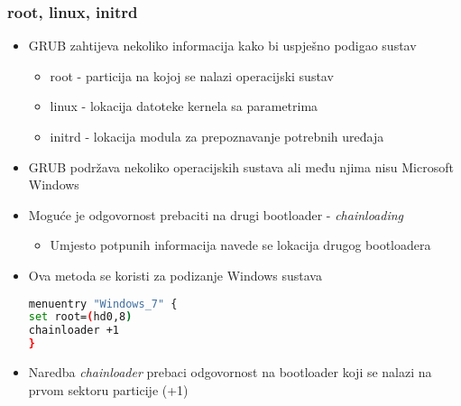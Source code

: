 \documentclass[croatian,t]{beamer} %
\begin{document}
	\begin{frame}[fragile]
	\frametitle{root, linux, initrd}
		\begin{itemize}
			\item GRUB zahtijeva nekoliko informacija kako bi uspješno podigao sustav
			\begin{itemize}
				\item root - particija na kojoj se nalazi operacijski sustav
				\item linux - lokacija datoteke kernela sa parametrima
				\item initrd - lokacija modula za prepoznavanje potrebnih uređaja
			\end{itemize}
			\item GRUB podržava nekoliko operacijskih sustava ali među njima nisu Microsoft Windows
			\item Moguće je odgovornost prebaciti na drugi bootloader - \emph{chainloading}
			\begin{itemize}
				\item Umjesto potpunih informacija navede se lokacija drugog bootloadera
			\end{itemize}
			\item Ova metoda se koristi za podizanje Windows sustava
			\begin{lstlisting}[basicstyle={\scriptsize\ttfamily},language=bash]
menuentry "Windows_7" {
set root=(hd0,8)
chainloader +1
}
			\end{lstlisting}
		\item Naredba \emph{chainloader} prebaci odgovornost na bootloader koji se nalazi na prvom sektoru particije (+1)
		\end{itemize}
	\end{frame}
\end{document}
